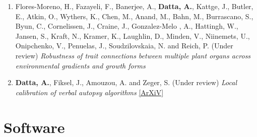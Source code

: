 \documentclass[11pt,a4paper,sans]{moderncv} %
\begin{document}
{\begin{enumerate}
\item \vskip 2mm Flores-Moreno, H.,   Fazayeli, F.,   Banerjee, A.,   \textbf{Datta, A.},   Kattge, J.,   Butler, E.,   Atkin, O.,   Wythers, K.,   Chen, M.,   Anand, M.,   Bahn, M.,   Burrascano, S.,   Byun, C.,   Cornelissen, J.,   Craine, J.,   Gonzalez-Melo , A.,   Hattingh, W.,   Jansen, S.,   Kraft, N.,   Kramer, K.,   Laughlin, D.,   Minden, V.,  Niinemets, U.,   Onipchenko, V., Penuelas, J.,   Soudzilovskaia, N.   and   Reich, P. (Under review) {\em Robustness of trait connections between multiple plant organs across environmental gradients and growth forms}

\item \vskip 4mm \textbf{Datta, A.}, Fiksel, J., Amouzou, A. and Zeger, S. (Under review) {\em Local calibration of verbal autopsy algorithms} \href{https://arxiv.org/pdf/1810.10572.pdf}{[ArXiV]}

%
%
%
%
%

\end{enumerate}

\section{Software}

}
\end{document}
